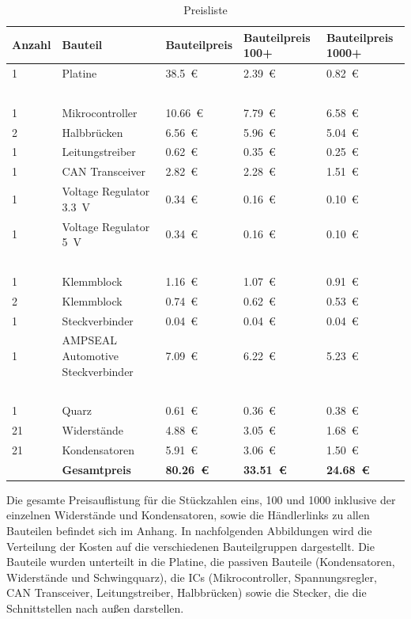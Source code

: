 \begin{table}[h]
	\centering
\begin{tabular}{ | l | l | l | l | l | }
\hline
	Anzahl & Bauteil & Bauteilpreis & Bauteilpreis 100+ & Bauteilpreis 1000+\\ \hline
	1 & Platine & \SI{38,5}{\euro} & \SI{2,39}{\euro} & \SI{0,82}{\euro}\\
	\  & \  & \  & \  & \  \\
	1 & Mikrocontroller & \SI{10,66}{\euro} & \SI{7,79}{\euro} & \SI{6,58}{\euro} \\
	2 & Halbbrücken & \SI{6,56}{\euro} & \SI{5,96}{\euro} & \SI{5,04}{\euro}\\
	1 & Leitungstreiber & \SI{0,62}{\euro} & \SI{0,35}{\euro} & \SI{0,25}{\euro} \\
	1 & CAN Transceiver & \SI{2,82}{\euro} & \SI{2,28}{\euro} & \SI{1,51}{\euro} \\
	1 & Voltage Regulator \SI{3,3}{V} & \SI{0,34}{\euro} & \SI{0,16}{\euro} & \SI{0,10}{\euro} \\
	1 & Voltage Regulator \SI{5}{V}& \SI{0,34}{\euro} & \SI{0,16}{\euro} & \SI{0,10}{\euro} \\
	\  & \  & \  & \  & \  \\
	1 & Klemmblock & \SI{1,16}{\euro} & \SI{1,07}{\euro} & \SI{0,91}{\euro} \\
	2 & Klemmblock & \SI{0,74}{\euro} & \SI{0,62}{\euro} & \SI{0,53}{\euro} \\
	1 & Steckverbinder & \SI{0,04}{\euro} & \SI{0,04}{\euro} & \SI{0,04}{\euro} \\
	1 & AMPSEAL Automotive Steckverbinder & \SI{7,09}{\euro} & \SI{6,22}{\euro} & \SI{5,23}{\euro}\\
	\  & \  & \  & \  & \  \\
	1 & Quarz & \SI{0,61}{\euro} & \SI{0,36}{\euro} & \SI{0,38}{\euro} \\
	21 & Widerstände & \SI{4,88}{\euro} & \SI{3,05}{\euro} & \SI{1,68}{\euro}\\
	21 & Kondensatoren & \SI{5,91}{\euro} & \SI{3,06}{\euro} & \SI{1,50}{\euro}\\ \hline
	\  & \textbf{Gesamtpreis} & \textbf{\SI{80,26}{\euro}}  & \textbf{\SI{33,51}{\euro}}  & \textbf{\SI{24,68}{\euro}}  \\ \hline
\end{tabular}
\caption{Preisliste}
	\label{tab:Preisliste}
\end{table}\noindent
Die gesamte Preisauflistung für die Stückzahlen eins, 100 und 1000 inklusive der einzelnen Widerstände und Kondensatoren, sowie die Händlerlinks zu allen Bauteilen befindet sich im Anhang.
In nachfolgenden Abbildungen wird die Verteilung der Kosten auf die verschiedenen Bauteilgruppen dargestellt. Die Bauteile wurden unterteilt in die Platine, die passiven Bauteile (Kondensatoren, Widerstände und Schwingquarz), die ICs (Mikrocontroller, Spannungsregler, CAN Transceiver, Leitungstreiber, Halbbrücken) sowie die Stecker, die die Schnittstellen nach außen darstellen. 

